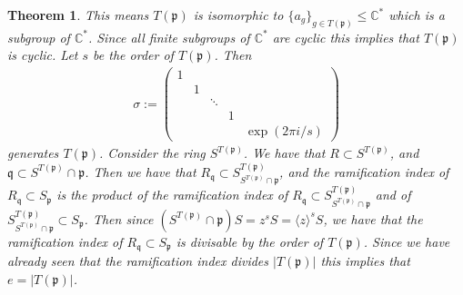 \documentclass[11pt, a4paper, english]{article}
\numberwithin{prop}{section}
\numberwithin{lemma}{section}
\newtheorem{theorem}{Theorem}
\numberwithin{theorem}{section}
\numberwithin{defin}{section}
\numberwithin{example}{section}
\newcommand{\C}{\mathbb{C}}
\begin{document}
\begin{theorem}
This means $T(\mathfrak{p})$ is isomorphic to $\{ a_g \}_{g \in T(\mathfrak{p})} \leq \C^*$ which is a subgroup of $\C^*$. Since all finite subgroups of $\C^*$ are cyclic this implies that $T(\mathfrak{p})$ is cyclic. Let $s$ be the order of $T(\mathfrak{p})$. Then
\begin{align*}
\sigma :=
\begin{pmatrix}
1\\
& 1\\
&& \ddots\\
&&&1\\
&&&& \exp(2\pi i/s)
\end{pmatrix}
\end{align*}
generates $T(\mathfrak{p})$. Consider the ring $S^{T(\mathfrak{p})}$. We have that $R \subset S^{T(\mathfrak{p})}$, and $\mathfrak{q} \subset S^{T(\mathfrak{p})} \cap \mathfrak{p}$. Then we have that $R_\mathfrak{q} \subset S^{T(\mathfrak{p})}_{S^{T(\mathfrak{p})} \cap \mathfrak{p}}$, and the ramification index of $R_\mathfrak{q} \subset S_\mathfrak{p}$ is the product of the ramification index of $R_\mathfrak{q} \subset S^{T(\mathfrak{p})}_{S^{T(\mathfrak{p})} \cap \mathfrak{p}}$ and of $S^{T(\mathfrak{p})}_{S^{T(\mathfrak{p})} \cap \mathfrak{p}} \subset S_\mathfrak{p}$. Then since $(S^{T(\mathfrak{p})} \cap \mathfrak{p})S = z^s S = \langle z \rangle^s S$, we have that the ramification index of $R_\mathfrak{q} \subset S_\mathfrak{p}$ is divisable by the order of $T(\mathfrak{p})$. Since we have already seen that the ramification index divides $|T(\mathfrak{p})|$ this implies that $e = |T(\mathfrak{p})|$.
\end{theorem}
\end{document}
